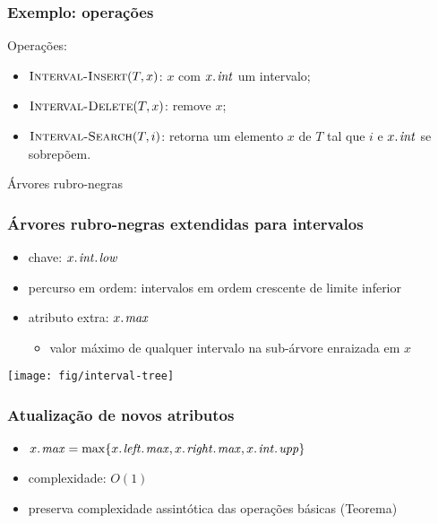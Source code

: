\documentclass{beamer}
\begin{document}
\begin{frame}
\frametitle{Exemplo: operações}

Operações:
\begin{itemize}
\item $\textnormal{\scshape Interval-Insert}(T, x)$: $x$ com $\attrib{x}{int}$ um intervalo;
\item $\textnormal{\scshape Interval-Delete}(T, x)$: remove $x$;
\item $\textnormal{\scshape Interval-Search}(T, i)$: retorna um elemento $x$ de $T$ tal que
  $i$ e $\attrib{x}{int}$ se sobrepõem.
\end{itemize}

\pause
\alert{Árvores rubro-negras}

\end{frame}

\begin{frame}
\frametitle{Árvores rubro-negras extendidas para intervalos}

\begin{itemize}
\item chave: $\attrib{\attrib{x}{int}}{low}$
\item percurso em ordem: intervalos em ordem crescente de limite inferior
\item atributo extra: $\attrib{x}{max}$
\begin{itemize}
\item valor máximo de qualquer intervalo na sub-árvore enraizada em $x$
\end{itemize}
\end{itemize}

\begin{center}
\texttt{[image: fig/interval-tree]}
\end{center}

\end{frame}

\begin{frame}
\frametitle{Atualização de novos atributos}

\begin{itemize}
\item $\attrib{x}{max} = \max \{ \attrib{\attrib{x}{left}}{max}, \attrib{\attrib{x}{right}}{max}, \attrib{\attrib{x}{int}}{upp} \}$
\item complexidade: $O(1)$
\item preserva complexidade assintótica das operações básicas (Teorema)
\end{itemize}

\end{frame}
\end{document}
